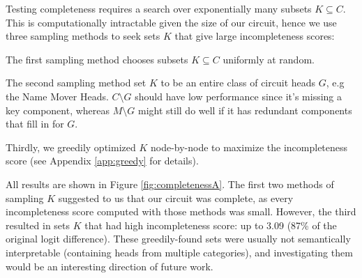 Testing completeness requires a search over exponentially many subsets $K \subseteq C$. This is computationally intractable given the size of our circuit, hence we use three sampling methods to seek sets $K$ that give large incompleteness scores:
\begin{compactitem}
\item The first sampling method chooses subsets $K \subseteq C$ uniformly at random.
\item The second sampling method set $K$ to be an entire class of circuit heads $G$, e.g the Name Mover Heads. $C \setminus G$ should have low performance since it's missing a key component, whereas $M \setminus G$ might still do well if it has redundant components that fill in for $G$. %
\item Thirdly, we greedily optimized $K$ node-by-node to maximize the incompleteness score (see Appendix \ref{app:greedy} for details).
\end{compactitem}
All results are shown in Figure \ref{fig:completenessA}.
The first two methods of sampling $K$ suggested to us that our circuit was complete, as every incompleteness score computed with those methods was small.  However, the third resulted in sets $K$ that had high incompleteness score: up to 3.09 (87\% of the original logit difference). These greedily-found sets were usually not semantically interpretable (containing heads from multiple categories), and investigating them would be an interesting direction of future work.


